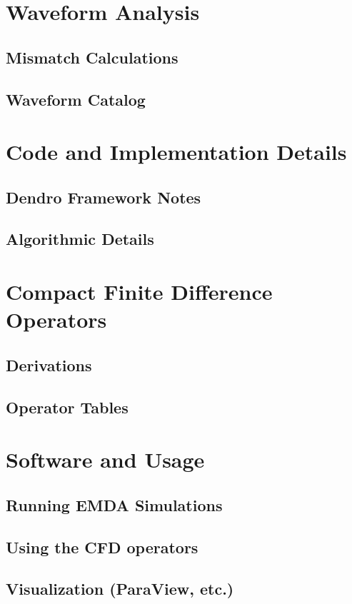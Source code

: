 \documentclass[12pt]{article}
\begin{document}
\section{Waveform Analysis}
\subsection{Mismatch Calculations}
\subsection{Waveform Catalog}

\section{Code and Implementation Details}
\subsection{Dendro Framework Notes}
\subsection{Algorithmic Details}

\section{Compact Finite Difference Operators}
\subsection{Derivations}
\subsection{Operator Tables}

\section{Software and Usage}
\subsection{Running EMDA Simulations}
\subsection{Using the CFD operators}
\subsection{Visualization (ParaView, etc.)}
\end{document}
